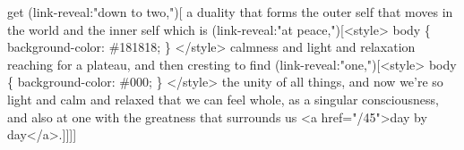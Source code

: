 get (link-reveal:"down to two,"){[} a duality that forms the outer self that moves in the world and the inner self which is (link-reveal:"at peace,"){[}\textless{}style\textgreater{} body \{ background-color: \#181818; \} \textless{}/style\textgreater{} calmness and light and relaxation reaching for a plateau, and then cresting to find (link-reveal:"one,"){[}\textless{}style\textgreater{} body \{ background-color: \#000; \} \textless{}/style\textgreater{} the unity of all things, and now we're so light and calm and relaxed that we can feel whole, as a singular consciousness, and also at one with the greatness that surrounds us \textless{}a href="/45"\textgreater{}day by day\textless{}/a\textgreater{}.{]}{]}{]}{]}

